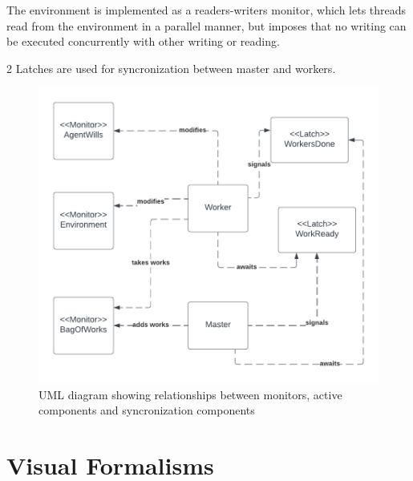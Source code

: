 \documentclass[12pt, a4paper]{report}
\begin{document}
The environment is implemented as a readers-writers monitor, which
 lets threads read from the environment in a parallel manner, but imposes
 that no writing can be executed concurrently with other writing or reading.

2 Latches are used for syncronization between master and workers.

\begin{figure}
    \centering
    \includegraphics{UML1.png}
    \caption{UML diagram showing relationships between monitors, active components and syncronization components}
\end{figure}

\section{Visual Formalisms}
\end{document}
